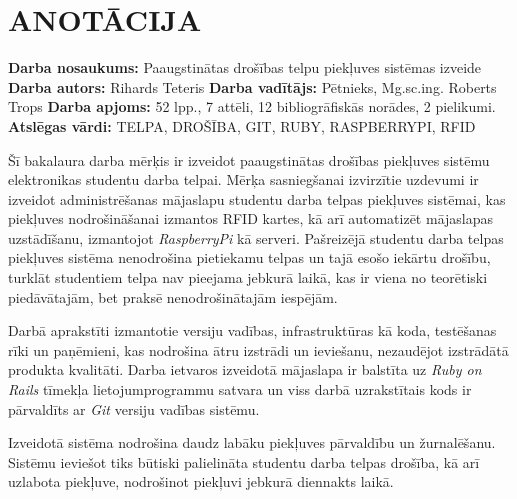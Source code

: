 \chapter*{ANOTĀCIJA}
\noindent \textbf{Darba nosaukums:} Paaugstinātas drošības telpu piekļuves sistēmas izveide\newline
\textbf{Darba autors:} Rihards Teteris\newline
\textbf{Darba vadītājs:} Pētnieks, Mg.sc.ing. Roberts Trops\newline
\textbf{Darba apjoms:} 52 lpp., 7 attēli, 12 bibliogrāfiskās norādes, 2 pielikumi.\newline
\textbf{Atslēgas vārdi:} TELPA, DROŠĪBA, GIT, RUBY, RASPBERRYPI, RFID\newline

Šī bakalaura darba mērķis ir izveidot paaugstinātas drošības piekļuves sistēmu elektronikas studentu darba telpai.
Mērķa sasniegšanai izvirzītie uzdevumi ir izveidot administrēšanas mājaslapu studentu darba telpas piekļuves sistēmai, kas piekļuves nodrošināšanai izmantos RFID kartes, kā arī automatizēt mājaslapas uzstādīšanu, izmantojot \textit{RaspberryPi} kā serveri. Pašreizējā studentu darba telpas piekļuves sistēma nenodrošina pietiekamu telpas un tajā esošo iekārtu drošību, turklāt studentiem telpa nav pieejama jebkurā laikā, kas ir viena no teorētiski piedāvātajām, bet praksē nenodrošinātajām iespējām.

Darbā aprakstīti izmantotie versiju vadības, infrastruktūras kā koda, testēšanas rīki un paņēmieni, kas nodrošina ātru izstrādi un ieviešanu, nezaudējot izstrādātā produkta kvalitāti. Darba ietvaros izveidotā mājaslapa ir balstīta uz \textit{Ruby on Rails} tīmekļa lietojumprogrammu satvara un viss darbā uzrakstītais kods ir pārvaldīts ar \textit{Git} versiju vadības sistēmu.

Izveidotā sistēma nodrošina daudz labāku piekļuves pārvaldību un žurnalēšanu. Sistēmu ieviešot tiks būtiski palielināta studentu darba telpas drošība, kā arī uzlabota piekļuve, nodrošinot piekļuvi jebkurā diennakts laikā.
